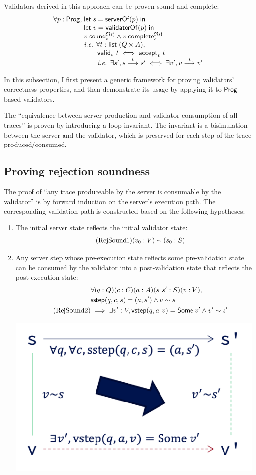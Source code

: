 Validators derived in this approach can be proven sound and complete:
\[\begin{array}{r@{\;}l}
\forall p:\Prog,&\letin{s}{\serverOf(p)}\\
&\letin{v}{\validatorOf(p)}\\
&\rejSound v s\wedge\rejComplete v s\\
&\text{\it i.e. }\forall t:\List(Q\times A),\\
&\qquad\valid s t\iff\accepts v t\\
&\qquad\text{\it i.e. }\exists s',\behaves s t s'\iff\exists v',\behaves v t v'
\end{array}\]

In this subsection, I first present a generic framework for proving validators'
correctness properties, and then demonstrate its usage by applying it to
$\mathsf{Prog}$-based validators.

The ``equivalence between server production and validator consumption of all
traces'' is proven by introducing a loop invariant.  The invariant is a
bisimulation between the server and the validator, which is preserved for each
step of the trace produced/consumed.

\subsection{Proving rejection soundness}
The proof of ``any trace produceable by the server is consumable by the
validator'' is by forward induction on the server's execution path.  The
corresponding validation path is constructed based on the following hypotheses:
\begin{enumerate}
\item The initial server state reflects the initial validator state:
  \begin{equation}
    \tag{RejSound1}
    \label{eq:rs1}
    (v_0:V)\sim (s_0:S)
  \end{equation}
\item Any server step whose pre-execution state reflects some pre-validation
  state can be consumed by the validator into a post-validation state that
  reflects the post-execution state:
  \begin{align*}
    &\forall(q:Q)(c:C)(a:A)(s,s':S)(v:V),\\
    &\mathsf{sstep}(q,c,s)=(a,s')\wedge v\sim s\\
    \tag{RejSound2}
    \label{eq:rs2}
    &\implies\exists v':V,\mathsf{vstep}(q,a,v)=\mathsf{Some}\;v'\wedge v'\sim s'
  \end{align*}
  \begin{center}
    \includegraphics[width=.5\textwidth]{figures/sound}
  \end{center}
\end{enumerate}

